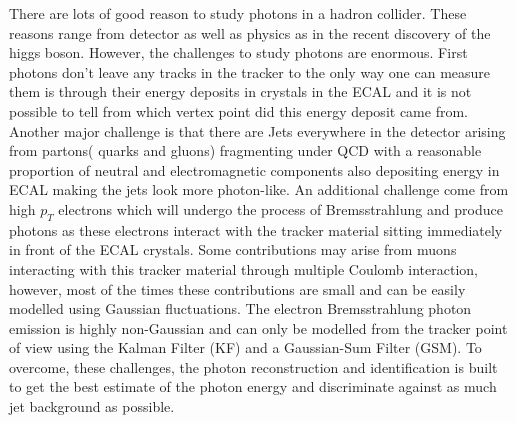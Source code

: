 There are lots of good reason to study photons in a hadron collider. These reasons range from detector as well as physics 
as in the recent discovery of the higgs boson. However, the challenges to study photons are enormous. First photons don't 
leave any tracks in the tracker to the only way one can measure them is through their energy deposits in crystals in the ECAL
and it is not possible to tell from which vertex point did this energy deposit came from. Another major challenge is that
there are Jets everywhere in the detector arising from partons( quarks and gluons) fragmenting under QCD with a reasonable
proportion of neutral and electromagnetic components also depositing energy in ECAL making the jets look more photon-like.
An additional challenge come from high $p_{T}$ electrons which will undergo the process of Bremsstrahlung and produce
photons as these electrons interact with the tracker material sitting immediately in front of the ECAL crystals. 
Some contributions may arise from muons interacting with this tracker material through multiple Coulomb interaction, however, most 
of the times these contributions are small and can be easily modelled using Gaussian fluctuations. The electron Bremsstrahlung
photon emission is highly non-Gaussian and can only be modelled from the tracker point of view using the Kalman Filter (KF)
and a Gaussian-Sum Filter (GSM).
To overcome, these challenges, the photon reconstruction and identification is built to get the best estimate of the photon
energy and discriminate against as much jet background as possible.

